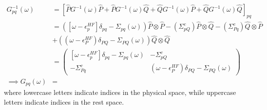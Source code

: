 \begin{align}
    G^{-1}_{pq}(\omega) 
&= \left[\hat{P} G^{-1}(\omega) \hat{P} + \hat{P} G^{-1}(\omega) \hat{Q} + \hat{Q} G^{-1}(\omega) \hat{P} + \hat{Q} G^{-1}(\omega) \hat{Q}\right]_{pq} \\
 &= \left(\left[\omega - \epsilon_p^{HF} \right] \delta _{pq}- \Sigma_{pq}(\omega)\right) \hat{P}\otimes \hat{P} - \left(\Sigma^c_{pQ}\right) \hat{P}\otimes \hat{Q} - \left(\Sigma^c_{Pq}\right) \hat{Q}\otimes \hat{P}\\
& + \left( (\omega - \epsilon_P^{HF}) \delta _{PQ} - \Sigma_{PQ}(\omega)\right) \hat{Q}\otimes \hat{Q} \\
&= \begin{pmatrix} \left[\omega - \epsilon_p^{HF} \right] \delta _{pq}- \Sigma_{pq}(\omega) & -\Sigma^c_{pQ} \\ -\Sigma^c_{Pq} & (\omega - \epsilon_P^{HF}) \delta _{PQ} - \Sigma_{PQ}(\omega) \end{pmatrix} \\
\implies G _{pq}(\omega)&=  
\end{align}
where lowercase letters indicate indices in the physical space, while uppercase letters indicate indices in the rest space.
